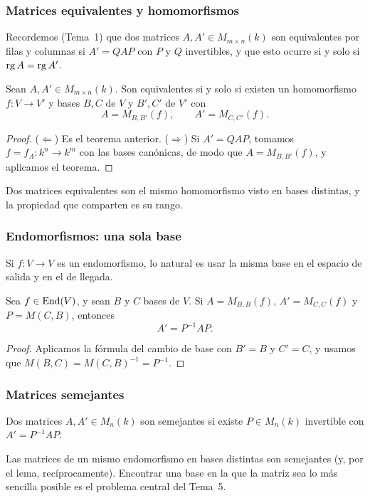 \begin{frame}
    \frametitle{Matrices equivalentes y homomorfismos}

    Recordemos (Tema~1) que dos matrices $A,A'\in M_{m\times n}(k)$ son
    \alert{equivalentes por filas y columnas} si $A'=QAP$ con $P$ y $Q$
    invertibles, y que esto ocurre si y solo si $\operatorname{rg} A=\operatorname{rg} A'$.

    \begin{corollary}
        Sean $A,A'\in M_{m\times n}(k)$. Son equivalentes si y solo si
        existen un homomorfismo $f\colon V\to V'$ y bases $B,C$ de $V$ y
        $B',C'$ de $V'$ con
        \[
            A=M_{B,B'}(f),\qquad A'=M_{C,C'}(f).
        \]
    \end{corollary}

    \begin{proof}
        ($\Leftarrow$) Es el teorema anterior. ($\Rightarrow$) Si
        $A'=QAP$, tomamos $f=f_A\colon k^n\to k^m$ con las bases
        canónicas, de modo que $A=M_{B,B'}(f)$, y aplicamos el teorema.
    \end{proof}

    \medskip

    Dos matrices equivalentes son \alert{el mismo homomorfismo} visto en
    bases distintas, y la propiedad que comparten es su \alert{rango}.
\end{frame}


\begin{frame}
    \frametitle{Endomorfismos: una sola base}

    Si $f\colon V\to V$ es un endomorfismo, lo natural es usar la
    \alert{misma} base en el espacio de salida y en el de llegada.

    \begin{corollary}
        Sea $f\in\operatorname{End}(V)$, y sean $B$ y $C$ bases de $V$. Si
        $A=M_{B,B}(f)$, $A'=M_{C,C}(f)$ y $P=M(C,B)$, entonces
        \[
            A'=P^{-1}AP.
        \]
    \end{corollary}

    \begin{proof}
        Aplicamos la fórmula del cambio de base con $B'=B$ y $C'=C$, y
        usamos que $M(B,C)=M(C,B)^{-1}=P^{-1}$.
    \end{proof}

\end{frame}


\begin{frame}
    \frametitle{Matrices semejantes}

    \begin{definition}
        Dos matrices $A,A'\in M_n(k)$ son \alert{semejantes} si existe
        $P\in M_n(k)$ invertible con $A'=P^{-1}AP$.
    \end{definition}

    Las matrices de un mismo endomorfismo en bases distintas son
    semejantes (y, por el lema, recíprocamente). Encontrar una base en la
    que la matriz sea lo más sencilla posible es el problema central del
    Tema~5.
\end{frame}


